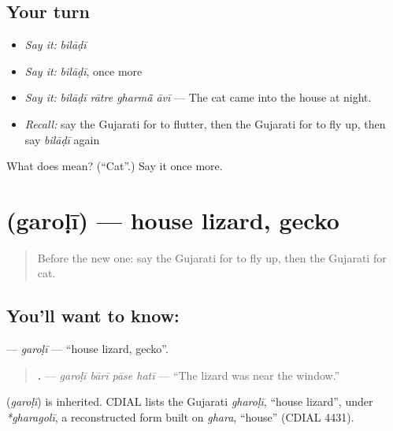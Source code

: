\subsection*{Your turn}
\begin{itemize}
\raggedright
  \item \emph{Say it:} \emph{bilāḍī}
  \item \emph{Say it:} \emph{bilāḍī}, once more
  \item \emph{Say it:} \emph{bilāḍī rātre gharmā̃ āvī} — The cat came into the house at night.
  \item \emph{Recall:} say the Gujarati for to flutter, then the Gujarati for to fly up, then say \emph{bilāḍī} again
\end{itemize}

\begin{tcolorbox}[breakable,colback=teal!4,colframe=teal!35!black,title={Before you move on}]
What does  mean? (\textquotedblleft{}Cat\textquotedblright{}.) Say it once more.
\end{tcolorbox}
\section[\texorpdfstring{\gu{ગરોળી} (garoḷī)}{ગરોળી (garoḷī)}]{ (garoḷī) — house lizard, gecko}

\label{lesson:GU-C238-garoli}



\begin{quote}
Before the new one: say the Gujarati for to fly up, then the Gujarati for cat.
\end{quote}

\subsection*{You'll want to know: }
\textbf{} — \emph{garoḷī} — \textquotedblleft{}house lizard, gecko\textquotedblright{}.

\begin{quote}
\textbf{   .} — \emph{garoḷī bārī pāse hatī} — \textquotedblleft{}The lizard was near the window.\textquotedblright{}
\end{quote}

\begin{cousinweb}
\textbf{} (\emph{garoḷī}) is inherited. CDIAL lists the Gujarati \emph{gharoḷī}, \textquotedblleft{}house lizard\textquotedblright{}, under \emph{*gharagolī}, a reconstructed form built on \emph{ghara}, \textquotedblleft{}house\textquotedblright{} (CDIAL 4431).
\end{cousinweb}

